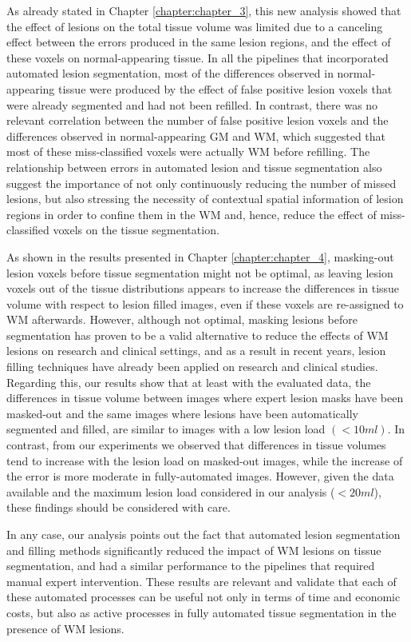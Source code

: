 As already stated in Chapter \ref{chapter:chapter_3}, this new analysis showed that the effect of lesions on the total tissue volume was limited due to a canceling effect between the errors produced in the same lesion regions, and the effect of these voxels on normal-appearing tissue. In all the pipelines that incorporated automated lesion segmentation, most of the differences observed in normal-appearing tissue were produced by the effect of false positive lesion voxels that were already segmented and had not been refilled. In contrast, there was no relevant correlation between the number of false positive lesion voxels and the differences observed in normal-appearing GM and WM, which suggested that most of these miss-classified voxels were actually WM before refilling. The relationship between errors in automated lesion and tissue segmentation also suggest the importance of not only continuously reducing the number of missed lesions, but also stressing the necessity of contextual spatial information of lesion regions in order to confine them in the WM and, hence, reduce the effect of miss-classified voxels on the tissue segmentation.

As shown in the results presented in Chapter \ref{chapter:chapter_4}, masking-out lesion voxels before tissue segmentation might not be optimal, as leaving lesion voxels out of the tissue distributions appears to increase the differences in tissue volume with respect to lesion filled images, even if these voxels are re-assigned to WM afterwards. However, although not optimal, masking lesions before segmentation has proven to be a valid alternative to reduce the effects of WM lesions on research and clinical settings, and as a result in recent years, lesion filling techniques have already been applied on research and clinical studies. Regarding this, our results show that at least with the evaluated data, the differences in tissue volume between images where expert lesion masks have been masked-out and the same images where lesions have been automatically segmented and filled, are similar to images with a low lesion load $(<10ml)$. In contrast, from our experiments we observed that differences in tissue volumes tend to increase with the lesion load on masked-out images, while the increase of the error is more moderate in  fully-automated images. However, given the data available and the maximum lesion load considered in our analysis ($<20ml$), these findings should be considered with care. 

In any case, our analysis points out the fact that automated lesion segmentation and filling methods significantly reduced the impact of WM lesions on tissue segmentation, and had a similar performance to the pipelines that required manual expert intervention. These results are relevant and validate that each of these automated processes can be useful not only in terms of time and economic costs, but also as active processes in fully automated tissue segmentation in the presence of WM lesions.

